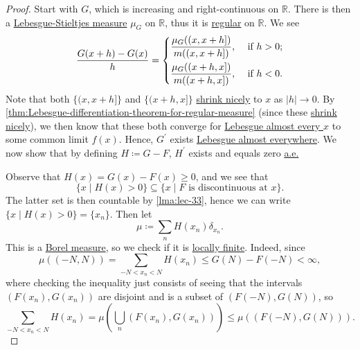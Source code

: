 \begin{proof}
	Start with \(G\), which is increasing and right-continuous on \(\mathbb{R}\). There is then a \hyperref[def:Lebesgue-Stieltjes-measure]{Lebesgue-Stieltjes measure}
	\(\mu_G\) on \(\mathbb{R}\), thus it is \hyperref[def:regular]{regular} on \(\mathbb{R}\). We see
	\[
		\frac{G(x+h) - G(x)}{h} = \begin{dcases}
			\frac{\mu _{G} ((x, x+h])}{m((x, x+h])}, & \text{ if } h>0 ; \\
			\frac{\mu _{G} ((x+h, x])}{m((x+h, x])}, & \text{ if } h<0 .
		\end{dcases}
	\]
	Note that both \(\{(x, x+h]\}\) and \(\{(x+h, x]\}\) \hyperref[def:shrink-nicely]{shrink nicely} to \(x\) as \(\left\vert h \right\vert \to 0\).
	By \autoref{thm:Lebesgue-differentiation-theorem-for-regular-measure} (since these \hyperref[def:shrink-nicely]{shrink nicely}), we
	then know that these both converge for \hyperref[def:mu-almost-everywhere]{Lebesgue almost every \(x\)} to some common limit \(f(x)\).
	Hence, \(G^\prime\) exists \hyperref[def:mu-almost-everywhere]{Lebesgue almost everywhere}. We now show that by defining \(H \coloneqq G - F\),
	\(H^\prime \) exists and equals zero \hyperref[def:mu-almost-everywhere]{a.e.}

	Observe that \(H(x) = G(x) - F(x) \geq 0\), and we see that
	\[
		\{x \mid H(x) > 0\} \subseteq \{x \mid F \text{ is discontinuous at } x\}.
	\]
	The latter set is then countable by \autoref{lma:lec-33}, hence we can write \(\{x \mid H(x) > 0\} = \{x_n\}\). Then let
	\[
		\mu \coloneqq \sum_n H(x_n) \delta_{x_n}.
	\]
	This is a \hyperref[def:Borel-measure]{Borel measure}, so we check if it is \hyperref[def:locally-finite]{locally finite}. Indeed, since
	\[
		\mu((-N,N)) = \sum_{-N < x_n < N} H(x_n) \leq G(N) - F(-N) < \infty,
	\]
	where checking the inequality just consists of seeing that the intervals \((F(x_n), G(x_n))\) are disjoint and is a subset of \((F(-N),G(N))\), so
	\[
		\sum_{-N < x_n < N} H(x_n) = \mu\left( \bigcup_n (F(x_n), G(x_n)) \right) \leq \mu((F(-N),G(N))).
	\]


\end{proof}
